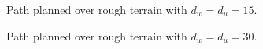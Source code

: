 				\begin{figure}
					\centering
					\caption{Path planned over rough terrain with $d_{w}=d_{u}=15$.}
					\label{fig::terrain_path_3}
				\end{figure}
				\begin{figure}
					\centering
					\caption{Path planned over rough terrain with $d_{w}=d_{u}=30$.}
					\label{fig::terrain_path_4}
				\end{figure}




